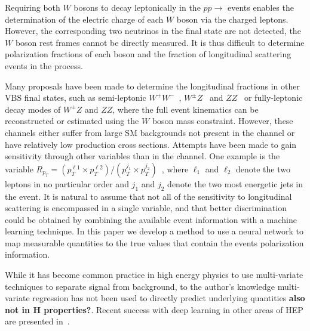 Requiring both $W$ bosons to decay leptonically in the $pp
\to$ \ssWW events enables the determination of the electric charge of
each $W$ boson via the charged leptons. However, the
corresponding two neutrinos in the final state are not detected, the
$W$ boson rest frames cannot be directly measured.  It is thus
difficult to determine polarization fractions of each boson and
the fraction of longitudinal scattering events in the \ssWW process.

Many proposals have been made to determine the longitudinal fractions in other VBS final states, such as semi-leptonic
$W^+W^-$~\cite{Han:2009em}, $W^\pm Z$~\cite{aa} and $ZZ$~\cite{le houche report} or
fully-leptonic decay modes of $W^\pm Z$ and $ZZ$, where the full
event kinematics can be reconstructed or estimated using the $W$ boson mass constraint. 
However, these channels either suffer from large SM backgrounds not present in the \ssWW channel or
have relatively low production cross sections. Attempts have been made
to gain sensitivity through other variables than \ts in the \ssWW
channel. One example is the variable $R_{p_T}=(p_{T}^{\ell 1} \times
p_{T}^{\ell 2}) / (p_T^{j_1} \times p_T^{j_2})$~\cite{Doroba:2012pd},
where $\ell_1$ and $\ell_2$ denote the two leptons in no particular
order and $j_1$ and $j_2$ denote the two most energetic jets in the
event.  It is natural to assume that not all of the sensitivity to
longitudinal scattering is encompassed in a single variable, and that
better discrimination could be obtained by combining the available
event information with a machine learning technique. In this paper we
develop a method to use a neural network to map measurable quantities
to the true \cts values that contain the events polarization information.

While it has become common practice in high energy physics to use
multi-variate techniques to separate signal from background, to the
author's knowledge multi-variate regression has not been used to
directly predict underlying quantities {\bf also not in H
  properties?}.  Recent success with deep learning in other areas of
HEP are presented in~\cite{Baldi:2014kfa,Baldi:2014pta}.

